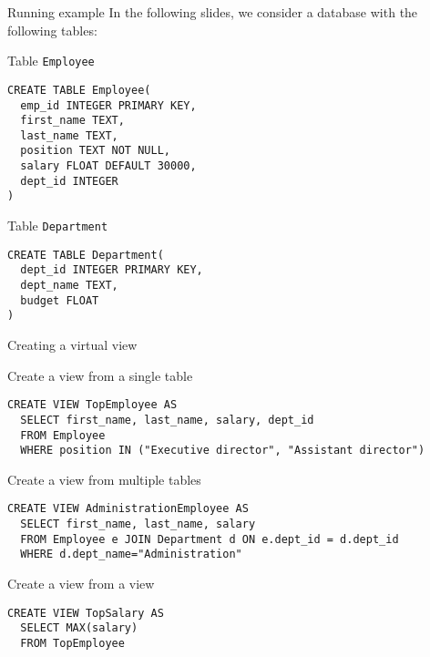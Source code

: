 \documentclass[xcolor=table]{beamer}
\begin{document}
\begin{frame}[fragile]{Running example}
  In the following slides, we consider 
  a database with the following tables: 
  \vfill
  \begin{block}{Table \texttt{Employee}}
    \footnotesize
\begin{verbatim}
CREATE TABLE Employee(
  emp_id INTEGER PRIMARY KEY,
  first_name TEXT,
  last_name TEXT,
  position TEXT NOT NULL,
  salary FLOAT DEFAULT 30000,
  dept_id INTEGER
)
\end{verbatim}
  \end{block}
  \vfill
  \begin{exampleblock}{Table \texttt{Department}}
    \footnotesize
\begin{verbatim}
CREATE TABLE Department(
  dept_id INTEGER PRIMARY KEY,
  dept_name TEXT,
  budget FLOAT
)
\end{verbatim}
  \end{exampleblock}
\end{frame}

\begin{frame}[fragile]{Creating a virtual view}

\begin{block}{Create a view from a single table}
  \footnotesize
\begin{verbatim}
CREATE VIEW TopEmployee AS
  SELECT first_name, last_name, salary, dept_id
  FROM Employee
  WHERE position IN ("Executive director", "Assistant director")
\end{verbatim}
\end{block}
\vfill
\begin{exampleblock}{Create a view from multiple tables}
  \footnotesize
\begin{verbatim}
CREATE VIEW AdministrationEmployee AS
  SELECT first_name, last_name, salary
  FROM Employee e JOIN Department d ON e.dept_id = d.dept_id
  WHERE d.dept_name="Administration" 
\end{verbatim}
\end{exampleblock}
\vfill
\begin{block}{Create a view from a view}
  \footnotesize
\begin{verbatim}
CREATE VIEW TopSalary AS
  SELECT MAX(salary)
  FROM TopEmployee
\end{verbatim}
\end{block}  

\end{frame}
\end{document}
